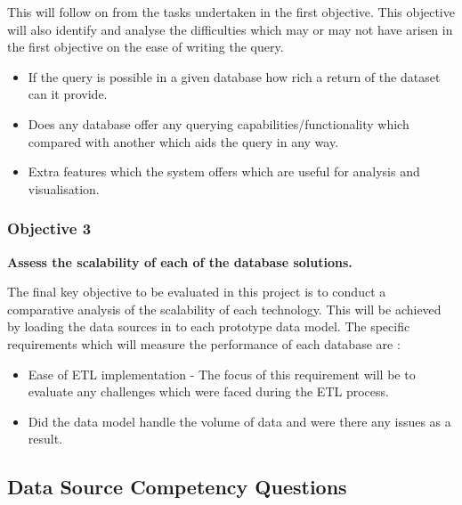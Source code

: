 This will follow on from the tasks undertaken in the first objective. This objective will also identify and analyse the difficulties which may or may not have arisen in the first objective on the ease of writing the query.

\begin{itemize}
\item If the query is possible in a given database how rich a return of the dataset can it provide.
\item Does any database offer any querying capabilities/functionality which compared with another which aids the query in any way.
\item Extra features which the system offers which are useful for analysis and visualisation.
\end{itemize}

\subsubsection*{Objective 3}
\textbf{Assess the scalability of each of the database solutions.}

The final key objective to be evaluated in this project is to conduct a comparative analysis of the scalability of each technology. This will be achieved by loading the data sources in to each prototype data model. The specific requirements which will measure the performance of each database are :

\begin{itemize}
\item Ease of ETL implementation - The focus of this requirement will be to evaluate any challenges which were faced during the ETL process.
\item Did the data model handle the volume of data and were there any issues as a result.
\end{itemize}

\newpage
\subsection{Data Source Competency Questions}\label{competency}

